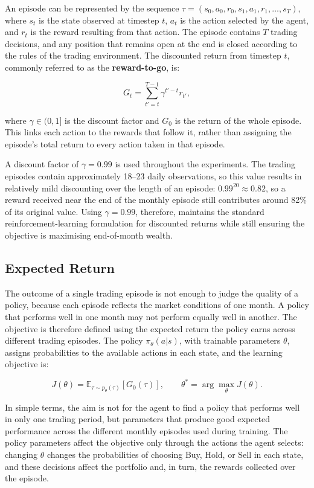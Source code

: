 An episode can be represented by the sequence
\(\tau = \left( s_{0},a_{0},r_{0},s_{1},a_{1},r_{1},\ldots,s_{T} \right)\),
where \(s_{t}\) is the state observed at timestep \(t\), \(a_{t}\) is
the action selected by the agent, and \(r_{t}\) is the reward resulting
from that action. The episode contains \(T\) trading decisions, and any
position that remains open at the end is closed according to the rules
of the trading environment. The discounted return from timestep \(t\),
commonly referred to as the \textbf{reward-to-go}, is:

\[G_{t} = \sum_{t' = t}^{T - 1}\gamma^{t' - t}r_{t'},\]

where \(\gamma \in (0,1\rbrack\) is the discount factor and \(G_{0}\) is
the return of the whole episode. This links each action to the rewards
that follow it, rather than assigning the episode's total return to
every action taken in that episode.

A discount factor of \(\gamma = 0.99\) is used throughout the
experiments. The trading episodes contain approximately 18--23 daily
observations, so this value results in relatively mild discounting over
the length of an episode: \({0.99}^{20} \approx 0.82\), so a reward
received near the end of the monthly episode still contributes around
82\% of its original value. Using \(\gamma = 0.99\), therefore,
maintains the standard reinforcement-learning formulation for discounted
returns while still ensuring the objective is maximising end-of-month
wealth.

\subsection{Expected Return}

The outcome of a single trading episode is not enough to judge the
quality of a policy, because each episode reflects the market conditions
of one month. A policy that performs well in one month may not perform
equally well in another. The objective is therefore defined using the
expected return the policy earns across different trading episodes. The
policy \(\pi_{\theta}\left( a|s \right)\), with trainable parameters
\(\theta\), assigns probabilities to the available actions in each
state, and the learning objective is:

\[J(\theta) = \mathbb{E}_{\tau \sim p_{\theta}(\tau)}\left\lbrack G_{0}(\tau) \right\rbrack,
\qquad \theta^{*} = \arg\max_{\theta}{J(\theta)}.\]

In simple terms, the aim is not for the agent to find a policy that
performs well in only one trading period, but parameters that produce
good expected performance across the different monthly episodes used
during training. The policy parameters affect the objective only through
the actions the agent selects: changing \(\theta\) changes the
probabilities of choosing Buy, Hold, or Sell in each state, and these
decisions affect the portfolio and, in turn, the rewards collected over
the episode.

